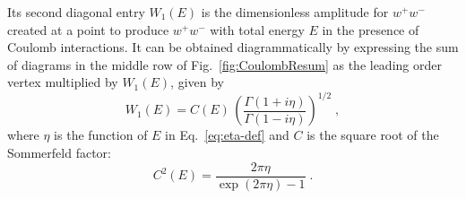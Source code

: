 \documentclass[%
 reprint,
 amsmath,amssymb,
 aps,
]{revtex4-1}
\begin{document}
Its second diagonal entry $W_1(E)$ is the dimensionless amplitude for $w^+w^-$ created at a point to produce $w^+w^-$ with total energy $E$ in the presence of Coulomb interactions.
It can be obtained diagrammatically by expressing the sum of diagrams in the middle row of Fig.~\ref{fig:CoulombResum} as the leading order vertex multiplied by $W_1(E)$, given by
\begin{equation}
W_1(E) = C(E) \, \left( \frac{\Gamma(1 + i \eta)}{\Gamma(1 - i \eta)} \right)^{1/2} \;,
\label{eq:W1-eta}
\end{equation}
where $\eta$ is the function of $E$ in Eq.~\eqref{eq:eta-def} and  $C$ is the square root of the Sommerfeld factor:
\begin{equation}
C^2(E)  = \frac{2 \pi \eta}{\exp(2 \pi \eta) - 1} \;.
\label{eq:Sommerfeld}
\end{equation}
\end{document}
